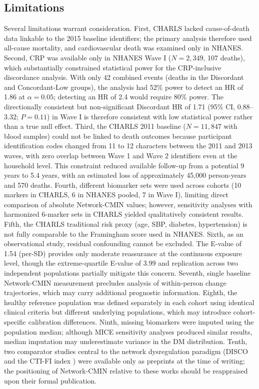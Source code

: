 \documentclass[11pt,a4paper]{article}
\begin{document}
\subsection{Limitations}

Several limitations warrant consideration. First, CHARLS lacked cause-of-death data linkable to the 2015 baseline identifiers; the primary analysis therefore used all-cause mortality, and cardiovascular death was examined only in NHANES. Second, CRP was available only in NHANES Wave I ($N = 2{,}349$, 107 deaths), which substantially constrained statistical power for the CRP-inclusive discordance analysis. With only 42 combined events (deaths in the Discordant and Concordant-Low groups), the analysis had 52\% power to detect an HR of 1.86 at $\alpha = 0.05$; detecting an HR of 2.4 would require 80\% power. The directionally consistent but non-significant Discordant HR of 1.71 (95\% CI, 0.88--3.32; $P = 0.11$) in Wave I is therefore consistent with low statistical power rather than a true null effect. Third, the CHARLS 2011 baseline ($N = 11{,}847$ with blood samples) could not be linked to death outcomes because participant identification codes changed from 11 to 12 characters between the 2011 and 2013 waves, with zero overlap between Wave 1 and Wave 2 identifiers even at the household level. This constraint reduced available follow-up from a potential 9 years to 5.4 years, with an estimated loss of approximately 45,000 person-years and 570 deaths. Fourth, different biomarker sets were used across cohorts (10 markers in CHARLS, 6 in NHANES pooled, 7 in Wave I), limiting direct comparison of absolute Network-CMIN values; however, sensitivity analyses with harmonized 6-marker sets in CHARLS yielded qualitatively consistent results. Fifth, the CHARLS traditional risk proxy (age, SBP, diabetes, hypertension) is not fully comparable to the Framingham score used in NHANES. Sixth, as an observational study, residual confounding cannot be excluded. The E-value of 1.54 (per-SD) provides only moderate reassurance at the continuous exposure level, though the extreme-quartile E-value of 3.99 and replication across two independent populations partially mitigate this concern. Seventh, single baseline Network-CMIN measurement precludes analysis of within-person change trajectories, which may carry additional prognostic information. Eighth, the healthy reference population was defined separately in each cohort using identical clinical criteria but different underlying populations, which may introduce cohort-specific calibration differences. Ninth, missing biomarkers were imputed using the population median; although MICE sensitivity analyses produced similar results, median imputation may underestimate variance in the DM distribution. Tenth, two comparator studies central to the network dysregulation paradigm (DISCO \cite{hao2025disco} and the CTI-FI index \cite{an2026ctifi}) were available only as preprints at the time of writing; the positioning of Network-CMIN relative to these works should be reappraised upon their formal publication.
\end{document}
